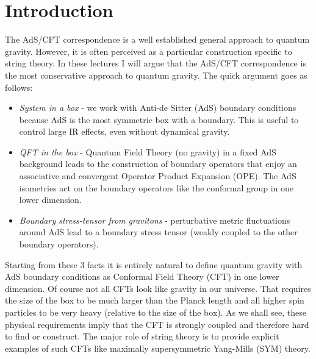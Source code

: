 \documentclass{ws-rv9x6}
\begin{document}
\section{Introduction}


The AdS/CFT correspondence \cite{hep-th/9711200, hep-th/9802109, hep-th/9802150} is a well established general approach to quantum gravity.
However, it is often perceived as a particular construction specific to string theory.
In these lectures I will argue that the AdS/CFT correspondence is the most conservative approach to quantum gravity. 
The quick argument goes as follows:
\begin{itemize}
\item  \emph{System in a box} - we work with Anti-de Sitter (AdS) boundary conditions because AdS is the most symmetric box with a boundary.  This is useful to control large IR effects, even without dynamical gravity.
\item \emph{QFT in the box} - Quantum Field Theory (no gravity) in a fixed AdS background leads to the construction of boundary operators that enjoy an associative and convergent Operator Product Expansion (OPE). The AdS isometries act on the boundary operators like the conformal group in one lower dimension.
\item \emph{Boundary stress-tensor from gravitons} - perturbative metric fluctuations around AdS lead to a boundary stress tensor (weakly coupled to the other boundary operators).
\end{itemize}
Starting from these 3 facts it is entirely natural to define quantum gravity with AdS boundary conditions as Conformal Field Theory (CFT) in one lower dimension. 
Of course not all CFTs look like gravity in our universe. That requires the size of the box to be much larger than the Planck length and all higher spin particles to be very heavy (relative to the size of the box). 
As we shall see,  these physical requirements imply that the CFT is strongly coupled and therefore hard to find or construct. The major role of string theory is to provide explicit examples of such CFTs like maximally supersymmetric Yang-Mills  (SYM) theory.
\end{document}
